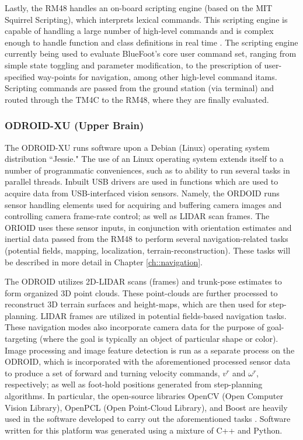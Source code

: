 			Lastly, the RM48 handles an on-board scripting engine (based on the MIT Squirrel Scripting), which interprets lexical commands. This scripting engine is capable of handling a large number of high-level commands and is complex enough to handle function and class definitions in real time \cite{Squirrel_website}. The scripting engine currently being used to evaluate BlueFoot's core user command set, ranging from simple state toggling and parameter modification, to the prescription of user-specified way-points for navigation, among other high-level command itams. Scripting commands are passed from the ground station (via terminal) and routed through the TM4C to the RM48, where they are finally evaluated.


			\subsubsection{ODROID-XU (Upper Brain)}

			The ODROID-XU runs software upon a Debian (Linux) operating system distribution ``Jessie." The use of an Linux operating system extends itself to a number of programmatic conveniences, such as to ability to run several tasks in parallel threads. Inbuilt USB drivers are used in functions which are used to acquire data from USB-interfaced vision sensors. Namely, the ORDOID runs sensor handling elements used for acquiring and buffering camera images and controlling camera frame-rate control; as well as LIDAR scan frames. The ORIOID uses these sensor inputs, in conjunction with orientation estimates and inertial data passed from the RM48 to perform several navigation-related tasks (\EG potential fields, mapping, localization, terrain-reconstruction). These tasks will be described in more detail in Chapter \ref{ch::navigation}.

			The ODROID utilizes 2D-LIDAR scans (frames) and trunk-pose estimates to form organized 3D point clouds. These point-clouds are further processed to reconstruct 3D terrain surfaces and height-maps, which are then used for step-planning. LIDAR frames are utilized in potential fields-based navigation tasks. These navigation modes also incorporate camera data for the purpose of goal-targeting (where the goal is typically an object of particular shape or color). Image processing and image feature detection is run as a separate process on the ODROID, which is incorporated with the aforementioned processed sensor data to produce a set of forward and turning velocity commands, $v^{r}$ and $\omega^{r}$, respectively; as well as foot-hold positions generated from step-planning algorithms. In particular, the open-source libraries OpenCV (Open Computer Vision Library), OpenPCL (Open Point-Cloud Library), and Boost are heavily used in the software developed to carry out the aforementioned tasks \cite{opencv_library,openpcl_library,boost_library}. Software written for this platform was generated using a mixture of C++ and Python.

